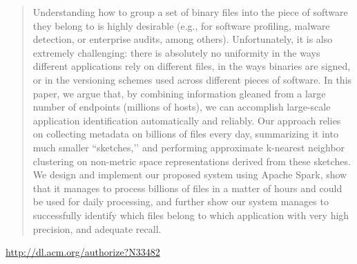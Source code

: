 \documentclass{article}
\begin{document}
\begin{quote}
Understanding how to group a set of binary files into the piece of software they belong to is highly desirable (e.g., for software profiling, malware detection, or enterprise audits, among others). Unfortunately, it is also extremely challenging: there is absolutely no uniformity in the ways different applications rely on different files, in the ways binaries are signed, or in the versioning schemes used across different pieces of software. In this paper, we argue that, by combining information gleaned from a large number of endpoints (millions of hosts), we can accomplish large-scale application identification automatically and reliably. Our approach relies on collecting metadata on billions of files every day, summarizing it into much smaller ``sketches,’’ and performing approximate k-nearest neighbor clustering on non-metric space representations derived from these sketches. We design and implement our proposed system using Apache Spark, show that it manages to process billions of files in a matter of hours and could be used for daily processing, and further show our system manages to successfully identify which files belong to which application with very high precision, and adequate recall.
\end{quote}

\href{http://dl.acm.org/authorize?N33482}{http://dl.acm.org/authorize?N33482}
\end{document}
